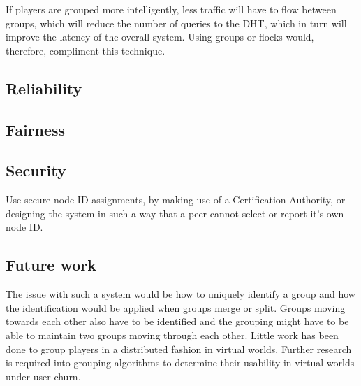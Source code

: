 \documentclass[10pt,a4paper,conference]{IEEEtran}
\begin{document}
If players are grouped more intelligently, less traffic will have to flow between groups, which will reduce the number of queries to the DHT, which
in turn will improve the latency of the overall system. Using groups or flocks would, therefore, compliment this technique.

\label{distance_based}


\subsection{Reliability}


\subsection{Fairness}


\subsection{Security}


Use secure node ID assignments, by making use of a Certification Authority, or designing the system in such a way that a peer cannot select or report
it's own node ID.

\subsection{Future work}

The issue with such a system would be how to uniquely identify a group and how the identification would be applied when groups merge or split. Groups
moving towards each other also have to be identified and the grouping might have to be able to maintain two groups moving through each other. Little
work has been done to group players in a distributed fashion in virtual worlds. Further research is required into grouping algorithms to determine
their usability in virtual worlds under user churn.
\end{document}
